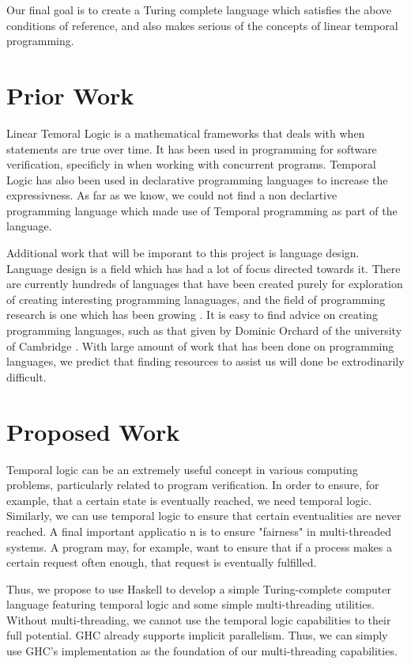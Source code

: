 \documentclass[numbers]{sigplanconf}
\begin{document}
Our final goal is to create a Turing complete language which satisfies
the above conditions of reference, and also makes serious of the
concepts of linear temporal programming.

\section{Prior Work}
 

Linear Temoral Logic is a mathematical frameworks that deals with when
statements are true over time. It has been used in programming for
software verification, specificly in when working with concurrent
programs\cite{AutomaticVerification, SimpleVerification}. Temporal
Logic has also been used in declarative programming languages to
increase the expressivness\cite{DeclarativeTemporal}. As far as we
know, we could not find a non declartive programming language which
made use of Temporal programming as part of the language. 

Additional work that will be imporant to this project is language design.
Language design is a field which has had a lot of focus directed
towards it. There are currently hundreds of languages that
have been created purely for exploration of creating interesting
programming lanaguages, and the field of programming research is one
which has been growing \cite{esolang}. It is easy to find advice on
creating programming languages, such as that given by Dominic Orchard
of the university of Cambridge \cite{4Rs}.  With large amount of work
that has been done on programming languages, we predict that finding
resources to assist us will done be extrodinarily difficult.

\section{Proposed Work}
Temporal logic can be an extremely useful concept in various 
computing problems, particularly related to program verification. 
In order to ensure, for example, that a certain state is eventually
reached,
 we need temporal logic. Similarly, we can use temporal logic to
 ensure
 that certain eventualities are never reached. A final important
 applicatio
n is to ensure "fairness" in multi-threaded systems. A program may, 
for example, want to ensure that if a process makes a certain request 
often enough, that request is eventually fulfilled.

Thus, we propose to use Haskell to develop a simple Turing-complete
 computer language featuring temporal logic and some simple
 multi-threading
 utilities. Without multi-threading, we cannot use the temporal logic 
capabilities to their full potential. GHC already supports implicit
parallelism.
 Thus, we can simply use GHC's implementation as the foundation
 of our multi-threading capabilities. 
\end{document}
